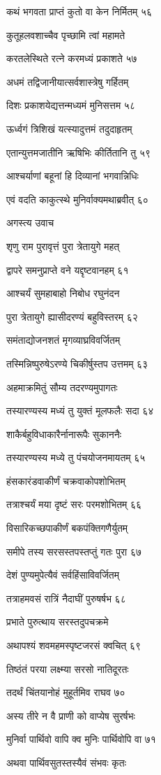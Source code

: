 कथं भगवता प्राप्तं कुतो वा केन निर्मितम् ५६

कुतूहलवशाच्चैव पृच्छामि त्वां महामते

करतलेस्थिते रत्ने करमध्यं प्रकाशते ५७

अधमं तद्विजानीयात्सर्वशास्त्रेषु गर्हितम्

दिशः प्रकाशयेद्यत्तन्मध्यमं मुनिसत्तम ५८

ऊर्ध्वगं त्रिशिखं यत्स्यादुत्तमं तदुदाहृतम्

एतान्युत्तमजातीनि ऋषिभिः कीर्तितानि तु ५९

आश्चर्याणां बहूनां हि दिव्यानां भगवान्निधिः

एवं वदति काकुत्स्थे मुनिर्वाक्यमथाब्रवीत् ६०

अगस्त्य उवाच

शृणु राम पुरावृत्तं पुरा त्रेतायुगे महत्

द्वापरे समनुप्राप्ते वने यद्दृष्टवानहम् ६१

आश्चर्यं सुमहाबाहो निबोध रघुनंदन

पुरा त्रेतायुगे ह्यासीदरण्यं बहुविस्तरम् ६२

समंताद्योजनशतं मृगव्याघ्रविवर्जितम्

तस्मिन्निष्पुरुषेऽरण्ये चिकीर्षुस्तप उत्तमम् ६३

अहमाक्रमितुं सौम्य तदरण्यमुपागतः

तस्यारण्यस्य मध्यं तु युक्तं मूलफलैः सदा ६४

शाकैर्बहुविधाकारैर्नानारूपैः सुकाननैः

तस्यारण्यस्य मध्ये तु पंचयोजनमायतम् ६५

हंसकारंडवाकीर्णं चक्रवाकोपशोभितम्

तत्राश्चर्यं मया दृष्टं सरः परमशोभितम् ६६

विसारिकच्छपाकीर्णं बकपंक्तिगणैर्युतम्

समीपे तस्य सरसस्तपस्तप्तुं गतः पुरा ६७

देशं पुण्यमुपेत्यैवं सर्वहिंसाविवर्जितम्

तत्राहमवसं रात्रिं नैदाघीं पुरुषर्षभ ६८

प्रभाते पुरुत्थाय सरस्तदुपचक्रमे

अथापश्यं शवमहमस्पृष्टजरसं क्वचित् ६९

तिष्ठंतं परया लक्ष्म्या सरसो नातिदूरतः

तदर्थं चिंतयानोहं मुहूर्तमिव राघव ७०

अस्य तीरे न वै प्राणी को वाप्येष सुरर्षभः

मुनिर्वा पार्थिवो वापि क्व मुनिः पार्थिवोपि वा ७१

अथवा पार्थिवसुतस्तस्यैवं संभवः कृतः

